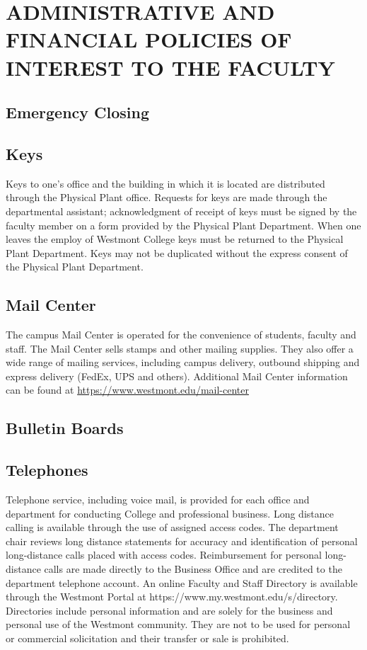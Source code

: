 \section{ADMINISTRATIVE AND FINANCIAL POLICIES OF INTEREST TO THE FACULTY}
	\subsection{Emergency Closing}
	\subsection{Keys}
		Keys to one's office and the building in which it is located are distributed through the Physical Plant office.  Requests for keys are made through the departmental assistant; acknowledgment of receipt of keys must be signed by the faculty member on a form provided by the Physical Plant Department.  When one leaves the employ of Westmont College keys must be returned to the Physical Plant Department.  Keys may not be duplicated without the express consent of the Physical Plant Department.
	\subsection{Mail Center}
		The campus Mail Center is operated for the convenience of students, faculty and staff. The Mail Center sells stamps and other mailing supplies. They also offer a wide range of mailing services, including campus delivery, outbound shipping and express delivery (FedEx, UPS and others).  Additional Mail Center information can be found at
		\href{https://www.westmont.edu/mail-center}{\url{https://www.westmont.edu/mail-center}}
	\subsection{Bulletin Boards}
	\subsection{Telephones}
		Telephone service, including voice mail, is provided for each office and department for conducting College and professional business.  Long distance calling is available through the use of assigned access codes.  The department chair reviews long distance statements for accuracy and identification of personal long-distance calls placed with access codes.  Reimbursement for personal long-distance calls are made directly to the Business Office and are credited to the department telephone account.  An online Faculty and Staff Directory is available through the Westmont Portal at https://www.my.westmont.edu/s/directory.  Directories include personal information and are solely for the business and personal use of the Westmont community.  They are not to be used for personal or commercial solicitation and their transfer or sale is prohibited.

